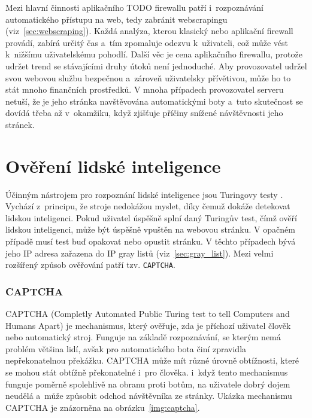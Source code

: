 Mezi hlavní činnosti aplikačního TODO firewallu patří i~rozpoznávání automatického přístupu na web, tedy zabránit webscrapingu (viz~\ref{sec:webscraping}). Každá analýza, kterou klasický nebo aplikační firewall provádí, zabírá určitý čas a~tím zpomaluje odezvu k~uživateli, což může vést k~nižšímu uživatelskému pohodlí. Další věc je cena aplikačního firewallu, protože udržet trend se stávajícími druhy útoků není jednoduché. Aby provozovatel udržel svou webovou službu bezpečnou a~zároveň uživatelsky přívětivou, může ho to stát mnoho finančních prostředků. V mnoha případech provozovatel serveru netuší, že je jeho stránka navštěvována automatickými boty a~tuto skutečnost se dovídá třeba až v~okamžiku, když zjišťuje příčiny snížené návštěvnosti jeho stránek.

\section{Ověření lidské inteligence}
Účinným nástrojem pro rozpoznání lidské inteligence jsou Turingovy testy \cite{bib:intelligence_detect}. Vychází z~principu, že stroje nedokážou myslet, díky čemuž dokáže detekovat lidskou inteligenci. Pokud uživatel úspěšně splní daný Turingův test, čímž ověří lidskou inteligenci, může být úspěšně vpuštěn na webovou stránku. V opačném případě musí test buď opakovat nebo opustit stránku. V těchto případech bývá jeho IP adresa zařazena do IP gray listů (viz~\ref{sec:gray_list}). Mezi velmi rozšířený způsob ověřování patří tzv. \texttt{CAPTCHA}.

\subsubsection*{CAPTCHA}
\label{sec:captcha}
CAPTCHA (Completly Automated Public Turing test to tell Computers and Humans Apart) je mechanismus, který ověřuje, zda je příchozí uživatel člověk nebo automatický stroj. Funguje na základě rozpoznávání, se kterým nemá problém většina lidí, avšak pro automatického bota činí zpravidla nepřekonatelnou překážku. CAPTCHA může mít různé úrovně obtížnosti, které se mohou stát obtížně překonatelné i~pro člověka. i~když tento mechanismus funguje poměrně spolehlivě na obranu proti botům, na uživatele dobrý dojem neudělá a~může způsobit odchod návštěvníka ze stránky. Ukázka mechanismu CAPTCHA je znázorněna na obrázku~\ref{img:captcha}.


